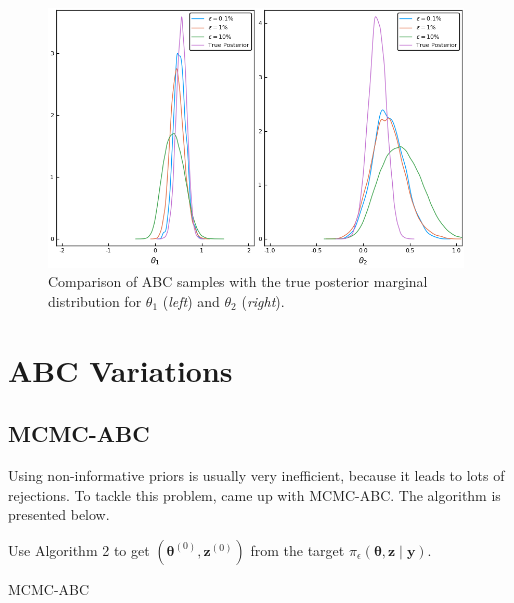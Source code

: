 \documentclass[runningheads]{llncs}
\begin{document}
    \begin{figure}[H]
        \centering
        \includegraphics[width=11cm]{images/ABCmodel1_Marginal.png}
        \caption{Comparison of ABC samples with the true posterior
        marginal distribution for $\theta_1$ (\textit{left}) and
        $\theta_2$ (\textit{right}).
        }
        \label{fig:calibration2}
    \end{figure}

\section{ABC Variations}
\subsection{MCMC-ABC}
\label{subsec:statistical-summaries}

Using non-informative priors is usually very inefficient,
because it leads to lots of rejections. To tackle this
problem, \citet{Marjoram2013} came up with MCMC-ABC.
The algorithm is presented below.

\hfill\break
\begin{algorithm}[H]
\SetAlgoLined
Use Algorithm 2 to get $(\bm \theta^{(0)}, \bm z^{(0)})$ from the
target $\pi_\epsilon(\bm \theta, \bm z \mid \bm y)$.

 \caption{MCMC-ABC}
\end{algorithm}
\hfill\break
\end{document}
